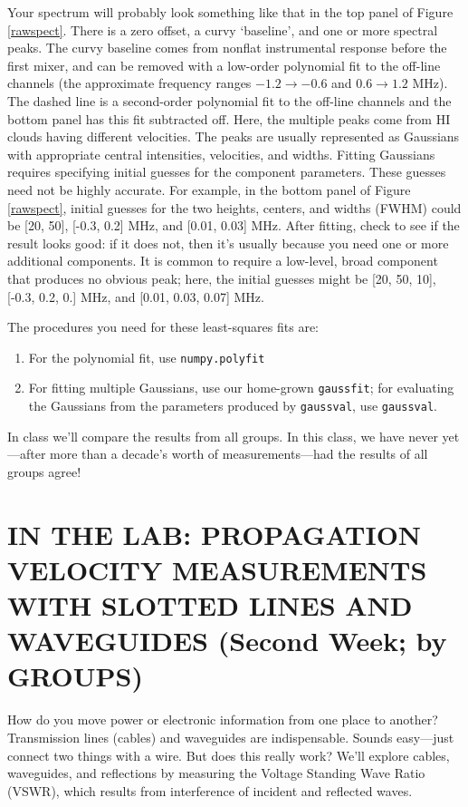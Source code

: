 \documentclass[12pt,preprint]{aastex}
\begin{document}
Your spectrum will probably look something like that in the top panel of
Figure \ref{rawspect}. There is a zero offset, a curvy `baseline', and
one or more spectral peaks. The curvy baseline comes from nonflat
instrumental response before the first mixer, and can be removed with a
low-order polynomial fit to the off-line channels (the approximate
frequency ranges $-1.2 \rightarrow -0.6$ and $ 0.6 \rightarrow 1.2$
MHz). The dashed line is a second-order polynomial fit to the off-line
channels and the bottom panel has this fit subtracted off.  Here, the
multiple peaks come from HI clouds having different velocities. The
peaks are usually represented as Gaussians with appropriate central
intensities, velocities, and widths.  Fitting Gaussians requires
specifying initial guesses for the component parameters. These guesses
need not be highly accurate. For example, in the bottom panel of Figure
\ref{rawspect}, initial guesses for the two heights, centers, and widths
(FWHM) could be [20, 50], [-0.3, 0.2] MHz, and [0.01, 0.03] MHz.  After
fitting, check to see if the result looks good: if it does not, then
it's usually because you need one or more additional components. It is
common to require a low-level, broad component that produces no obvious
peak; here, the initial guesses might be [20, 50, 10], [-0.3, 0.2, 0.]
MHz, and [0.01, 0.03, 0.07] MHz. 

The procedures you need for these least-squares fits
are: \begin{enumerate}
\item For the polynomial fit, use {\tt numpy.polyfit}

\item For fitting multiple Gaussians, use our home-grown {\tt gaussfit}; for
  evaluating the Gaussians from the parameters produced by {\tt gaussval}, %
  use {\tt gaussval}.
\end{enumerate}

In class we'll compare the results from all groups. In this class, we
have never yet---after more than a decade's worth of measurements---had
the results of all groups agree!

\section {IN THE LAB: PROPAGATION VELOCITY MEASUREMENTS WITH SLOTTED LINES AND 
WAVEGUIDES (Second Week; by GROUPS)} \label{expt}

How do you move power or electronic information from one place to
another? Transmission lines (cables) and waveguides are
indispensable. Sounds easy---just connect two things with a wire. But
does this really work? We'll explore cables, waveguides, and reflections
by measuring the Voltage Standing Wave Ratio (VSWR), which results from
interference of incident and reflected waves.
\end{document}
